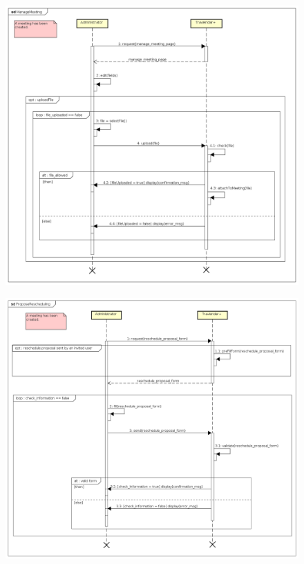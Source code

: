\begin{figure}[H]
\centering\includegraphics[width=\textwidth]{Images/SequenceDiagrams/Admin/ManageMeeting.png}{}
\caption{}
\end{figure}

\begin{figure}[H]
\centering\includegraphics[width=\textwidth]{Images/SequenceDiagrams/Admin/ProposeRescheduling.png}{}
\caption{}
\end{figure}